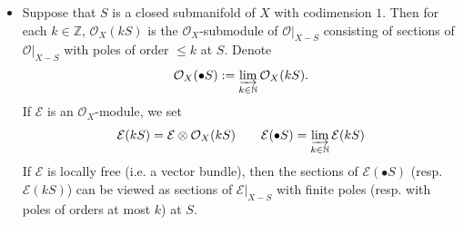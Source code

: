 \documentclass[11pt,b5paper,notitlepage]{article}
\theoremstyle{definition}
\theoremstyle{plain}
\newcommand{\mc}{\mathcal}
\newcommand{\blt}{\bullet}
\newcommand{\Nbb}{\mathbb N}
\newcommand{\Zbb}{\mathbb Z}
\newcommand{\<}{\left\langle}
\renewcommand{\>}{\right\rangle}
\newcommand{\MO}{\mathcal{O}}
\newcommand{\ME}{\mathcal{E}}
\numberwithin{equation}{section}
\begin{document}
\begin{subappendices}
\begin{itemize}
    \item Suppose that $S$ is a closed submanifold of $X$ with codimension $1$. Then for each $k\in \Zbb$, $\mc O_X(kS)$ is the $\mc O_X$-submodule of $\MO\vert_{X- S}$ consisting of sections of $\MO\vert_{X- S}$ with poles of order $\leq k$ at $S$. Denote 
    \begin{align*}
        \MO_X(\blt S):=\varinjlim_{k\in \Nbb}\MO_X(k S).
    \end{align*}
If $\ME$ is an $\MO_X$-module, we set \index{ES@$\mc E(kS),\mc E(\blt S)$}
    \begin{gather*}
\mc E(kS)=\mc E\otimes\mc O_X(kS)\qquad \mc E(\blt S)=\varinjlim_{k\in \Nbb}\ME(k S)
    \end{gather*}
    If $\mc E$ is locally free (i.e. a vector bundle), then the sections of $\mc E(\blt S)$ (resp. $\mc E(k S)$) can be viewed as sections of $\mc E|_{X- S}$ with finite poles (resp. with poles of orders at most $k$) at $S$.
    

\end{itemize}
\end{subappendices}
\end{document}
